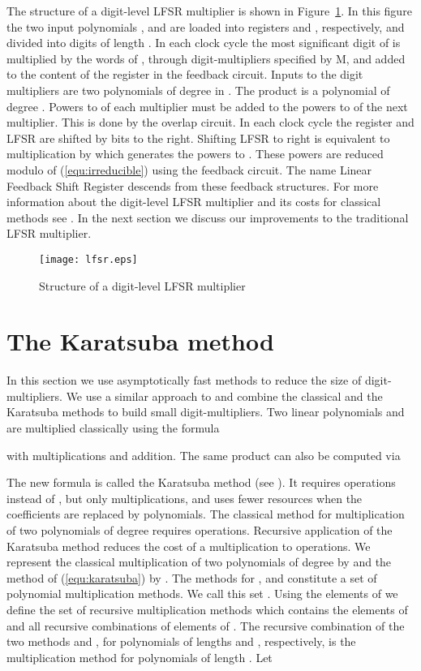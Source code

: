 \documentclass{article}
\begin{document}
The structure of a digit-level LFSR multiplier is shown in
Figure~\ref{fig:lfsr}. In this figure the two input polynomials
, and  are loaded into registers  and ,
respectively, and divided into digits of length . In each clock
cycle the most significant digit of  is multiplied by the words of
, through digit-multipliers specified by M, and added to the
content of the register in the feedback circuit.
Inputs to the digit multipliers are two polynomials of degree  in .
The product is a polynomial of degree . Powers  to
 of each multiplier must be added to the powers  to
 of the next multiplier. This is done by the overlap circuit.
In each clock cycle the register  and LFSR are shifted by  bits to the right.
Shifting LFSR to right is equivalent to multiplication by  which
generates the powers  to . These powers are reduced
modulo  of (\ref{equ:irreducible}) using the feedback circuit. 
The name Linear Feedback Shift Register descends from these feedback structures. 
 For more information about the digit-level LFSR multiplier and its
 costs for classical methods see \cite{sho06}. In the next section we
 discuss our improvements to the traditional LFSR multiplier.  

\begin{figure}
\texttt{[image: lfsr.eps]}
\caption{Structure of a digit-level LFSR multiplier}
\label{fig:lfsr}
\end{figure}


\section{The Karatsuba method}
\label{sec:circuit}

In this section we use asymptotically fast methods to reduce the size of digit-multipliers. 
We use a similar approach to \cite{gatsho06} and combine the classical
and the Karatsuba methods to build small digit-multipliers.
Two linear polynomials  and  are multiplied
classically using the formula

with  multiplications and  addition. 
The same product can also be computed via

The new formula is called the Karatsuba method (see
\cite{karofm63}). It requires  operations instead of , but only
 multiplications, and uses fewer resources when the coefficients
  are replaced by polynomials. 
The classical method for multiplication of two polynomials of degree
 requires  operations. Recursive application of
the Karatsuba method reduces the cost of a multiplication to
 operations.
We represent the classical multiplication of two polynomials of degree
 by  and the method of (\ref{equ:karatsuba}) by
.
The methods  for , and 
constitute a set of polynomial multiplication methods. We call this set
. Using the elements of  we define the set of
recursive multiplication methods  which contains the
elements of  and all recursive combinations of elements of
. The recursive combination of the two methods
 and , for polynomials of lengths  and
, respectively, is the multiplication method
 for polynomials of length . Let
\end{document}

